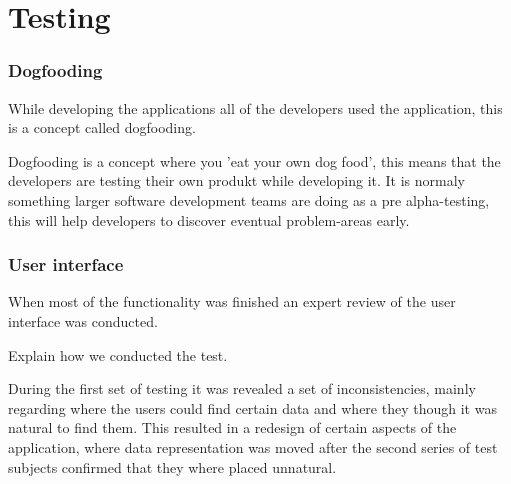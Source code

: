 
\section{Testing}
\subsubsection{Dogfooding}
While developing the applications all of the developers used the application, this is a concept called dogfooding.

Dogfooding is a concept where you 'eat your own dog food', this means that the developers are testing their own produkt while developing it. It is normaly something larger software development teams are doing as a pre alpha-testing, this will help developers to discover eventual problem-areas early.

\subsubsection{User interface}
When most of the functionality was finished an expert review of the user interface was conducted.

Explain how we conducted the test.

During the first set of testing it was revealed a set of inconsistencies, mainly regarding where the users could find certain data and where they though it was natural to find them. 
This resulted in a redesign of certain aspects of the application, where data representation was moved after the second series of test subjects confirmed that they where placed unnatural.